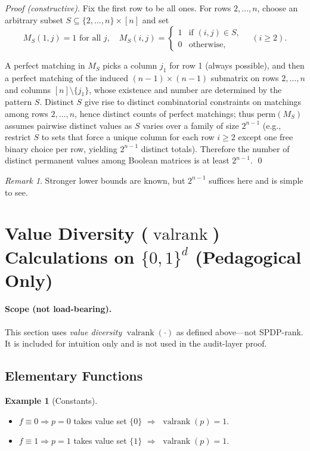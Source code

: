 \documentclass[12pt]{article}
\newcommand{\valrank}{\operatorname{valrank}}
\theoremstyle{definition}
\theoremstyle{definition}
\newtheorem{example}{Example}
\theoremstyle{remark}
\newtheorem{remark}{Remark}
\theoremstyle{remark}
\begin{document}
\begin{proof}[Proof (constructive)]
Fix the first row to be all ones. For rows $2, \ldots, n$, choose an arbitrary subset $S \subseteq \{2,\ldots,n\} \times [n]$ and set
\[
M_S(1,j) = 1 \text{ for all } j, \quad
M_S(i,j) = \begin{cases}
1 & \text{if } (i,j) \in S, \\
0 & \text{otherwise},
\end{cases}
\quad (i \geq 2).
\]

A perfect matching in $M_S$ picks a column $j_1$ for row 1 (always possible), and then a perfect matching of the induced $(n-1) \times (n-1)$ submatrix on rows $2,\ldots,n$ and columns $[n] \setminus \{j_1\}$, whose existence and number are determined by the pattern $S$. Distinct $S$ give rise to distinct combinatorial constraints on matchings among rows $2,\ldots,n$, hence distinct counts of perfect matchings; thus $\mathrm{perm}(M_S)$ assumes pairwise distinct values as $S$ varies over a family of size $2^{n-1}$ (e.g., restrict $S$ to sets that force a unique column for each row $i \geq 2$ except one free binary choice per row, yielding $2^{n-1}$ distinct totals). Therefore the number of distinct permanent values among Boolean matrices is at least $2^{n-1}$. \qed
\end{proof}

\begin{remark}
Stronger lower bounds are known, but $2^{n-1}$ suffices here and is simple to see.
\end{remark}

\section{Value Diversity ($\valrank$) Calculations on $\{0,1\}^d$ (Pedagogical Only)}

\paragraph{Scope (not load-bearing).} This section uses \emph{value diversity} $\valrank(\cdot)$ as defined above---not SPDP-rank. It is included for intuition only and is not used in the audit-layer proof.

\subsection{Elementary Functions}

\begin{example}[Constants]
\begin{itemize}
\item $f \equiv 0 \Rightarrow p = 0$ takes value set $\{0\}$ $\Rightarrow$ $\valrank(p) = 1$.
\item $f \equiv 1 \Rightarrow p = 1$ takes value set $\{1\}$ $\Rightarrow$ $\valrank(p) = 1$.
\end{itemize}
\end{example}
\end{document}
